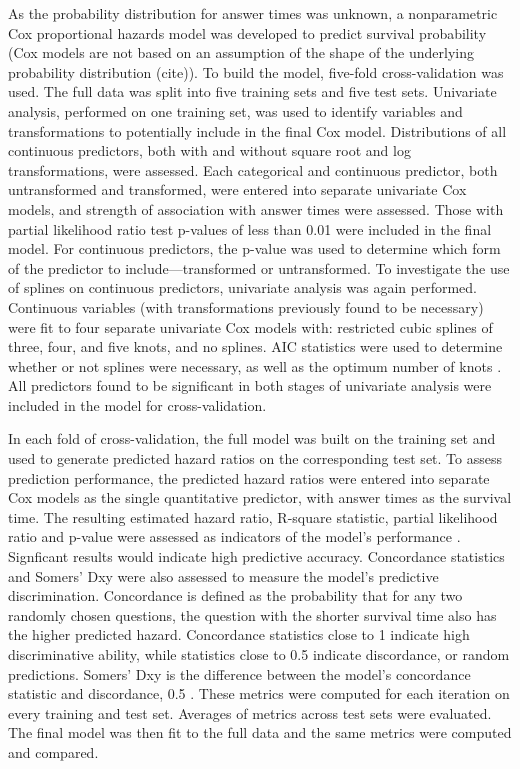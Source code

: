 \documentclass{article}
\begin{document}
As the probability distribution for answer times was unknown, a nonparametric Cox proportional hazards model was developed to predict survival probability (Cox models are not based on an assumption of the shape of the underlying probability distribution (cite)). To build the model, five-fold cross-validation was used. The full data was split into five training sets and five test sets. Univariate analysis, performed on one training set, was used to identify variables and transformations to potentially include in the final Cox model. Distributions of all continuous predictors, both with and without square root and log transformations, were assessed. Each categorical and continuous predictor, both untransformed and transformed, were entered into separate univariate Cox models, and strength of association with answer times were assessed. Those with partial likelihood ratio test p-values of less than 0.01 were included in the final model. For continuous predictors, the p-value was used to determine which form of the predictor to include---transformed or untransformed. To investigate the use of splines on continuous predictors, univariate analysis was again performed. Continuous variables (with transformations previously found to be necessary) were fit to four separate univariate Cox models with: restricted cubic splines of three, four, and five knots, and no splines. AIC statistics were used to determine whether or not splines were necessary, as well as the optimum number of knots \citep{Harrell2015}. All predictors found to be significant in both stages of univariate analysis were included in the model for cross-validation. 

In each fold of cross-validation, the full model was built on the training set and used to generate predicted hazard ratios on the corresponding test set. To assess prediction performance, the predicted hazard ratios were entered into separate Cox models as the single quantitative predictor, with answer times as the survival time. The resulting estimated hazard ratio, R-square statistic, partial likelihood ratio and p-value were assessed as indicators of the model's performance \citep{Chen}. Signficant results would indicate high predictive accuracy. Concordance statistics and Somers' Dxy were also assessed to measure the model's predictive discrimination. Concordance is defined as the probability that for any two randomly chosen questions, the question with the shorter survival time also has the higher predicted hazard. Concordance statistics close to 1 indicate high discriminative ability, while statistics close to 0.5 indicate discordance, or random predictions. Somers' Dxy is the difference between the model's concordance statistic and discordance, 0.5 \citep{Harrell2015}. These metrics were computed for each iteration on every training and test set. Averages of metrics across test sets were evaluated. The final model was then fit to the full data and the same metrics were computed and compared. 
\end{document}
